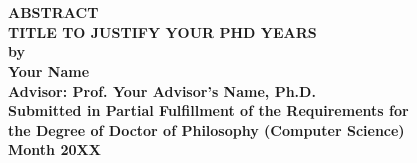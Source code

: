 \documentclass[12pt,draft,letterpaper]{report}
\newcommand{\thesistitle}{TITLE TO JUSTIFY YOUR PHD YEARS}
\newcommand{\thesisauthor}{Your Name}
\newcommand{\thesisadvisor}{Your Advisor's Name}
\newcommand{\graddate}{Month 20XX} %
\begin{document}
\section*{}
\begin{center}
{\bfseries 
  \vspace{.25in}  
  {\bf ABSTRACT}\\
  \vspace{.25in}
  {\bf \thesistitle}\\  
  \vspace{.25in}
  {\bf by}\\  
  \vspace{.5in}
  {\bf \thesisauthor}\\
  \vspace{.5in}
  {\bf Advisor: Prof. \thesisadvisor, Ph.D.}\\
  \vspace{.25in}
  {\bf Submitted in Partial Fulfillment of the Requirements for}\\
  {\bf the Degree of Doctor of Philosophy (Computer Science)}\\
  \vspace{.25in}
  {\bf \graddate}  
  \vspace{.25in}
}
\end{center}

\newpage

\tableofcontents

\listoffigures{}
\newpage

\listoftables{}
\newpage


%
\end{document}

